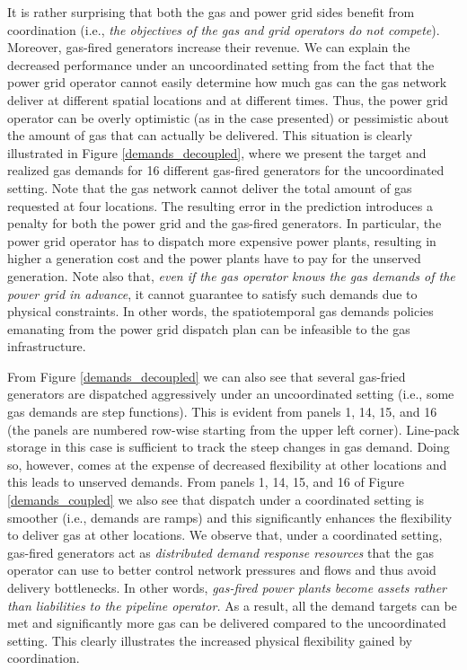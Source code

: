 \documentclass[11pt,twoside]{article}
\begin{document}
It is rather surprising that both the gas and power grid sides benefit from coordination (i.e., {\em the objectives of the gas and grid operators do not compete}). Moreover, gas-fired generators increase their revenue.  We can explain the decreased performance under an uncoordinated setting from the fact that the power grid operator cannot easily determine how much gas can the gas network deliver at different spatial locations and at different times. Thus, the power grid operator can be overly optimistic (as in the case presented) or pessimistic about the amount of gas that can actually be delivered. This situation is clearly illustrated in Figure \ref{demands_decoupled}, where we present the target and realized gas demands for 16 different gas-fired generators for the uncoordinated setting. Note that the gas network cannot deliver the total amount of gas requested at four locations. The resulting error in the prediction introduces a penalty for both the power grid and the gas-fired generators. In particular, the power grid operator has to dispatch more expensive power plants, resulting in higher a generation cost and the power plants have to pay for the unserved generation.  Note also that, {\em even if the gas operator knows the gas demands of the power grid in advance}, it cannot guarantee to satisfy such demands due to physical constraints.  In other words, the spatiotemporal gas demands policies emanating from the power grid dispatch plan can be infeasible to the gas infrastructure. 

From  Figure \ref{demands_decoupled}  we can also see that several gas-fried generators are dispatched  aggressively under an uncoordinated setting (i.e., some gas demands are step functions). This is evident from panels 1, 14, 15, and 16 (the panels are numbered row-wise starting from the upper left corner). Line-pack storage in this case is sufficient to track the steep changes in gas demand. Doing so, however, comes at the expense of decreased flexibility at other locations and this leads to unserved demands.  From panels 1, 14, 15, and 16 of Figure \ref{demands_coupled} we also see that dispatch under a coordinated setting is smoother (i.e., demands are ramps) and this significantly enhances the flexibility to deliver gas at other locations. We observe that, under a coordinated setting, gas-fired generators act as {\em distributed demand response resources}  that the gas operator can use to better control network pressures and flows and thus avoid delivery bottlenecks. In other words, {\em gas-fired power plants become assets rather than liabilities to the pipeline operator.} As a result, all the demand targets can be met and significantly more gas can be delivered compared to the uncoordinated setting. This clearly illustrates the increased physical flexibility gained by coordination.  
\end{document}

